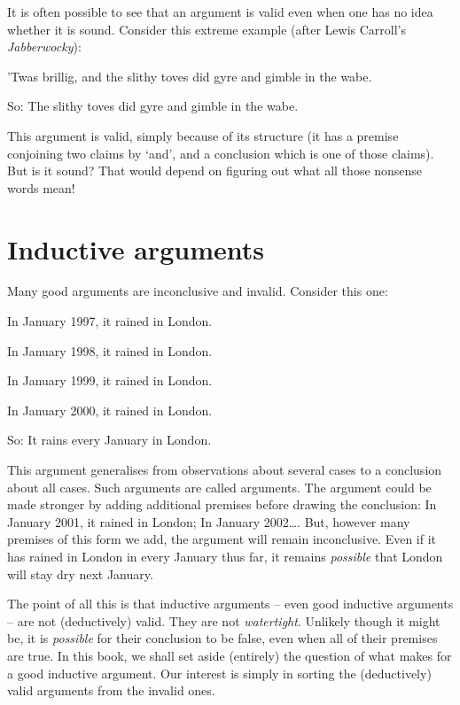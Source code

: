 It is often possible to see that an argument is valid even when one has no idea whether it is sound. Consider this extreme example (after Lewis Carroll's \emph{Jabberwocky}):
\begin{earg}
	\item[] ’Twas brillig, \textsf{and} the slithy toves did gyre and gimble in the wabe.
	\item[So:] The slithy toves did gyre and gimble in the wabe.
\end{earg} This argument is valid, simply because of its structure (it has a premise conjoining two claims by `and', and a conclusion which is one of those claims). But is it sound? That would depend on figuring out what all those nonsense words mean!

\section{Inductive arguments}
Many good arguments are inconclusive and invalid. Consider this one:
	\begin{earg}
		\item[] In January 1997, it rained in London.
		\item[] In January 1998, it rained in London.
		\item[] In January 1999, it rained in London.
		\item[] In January 2000, it rained in London.
	\item[So:] It rains every January in London.
\end{earg}
This argument generalises from observations about several cases to a conclusion about all cases. Such arguments are called  arguments. The argument could be made stronger by adding additional premises before drawing the conclusion: In January 2001, it rained in London; In January 2002\ldots. But, however many premises of this form we add, the argument will remain inconclusive. Even if it has rained in London in every January thus far, it remains \emph{possible} that London will stay dry next January.

The point of all this is that inductive arguments – even good inductive arguments – are not (deductively) valid. They are not \emph{watertight}. Unlikely though it might be, it is \emph{possible} for their conclusion to be false, even when all of their premises are true. In this book, we shall set aside (entirely) the question of what makes for a good inductive argument. Our interest is simply in sorting the (deductively) valid arguments from the invalid ones.



